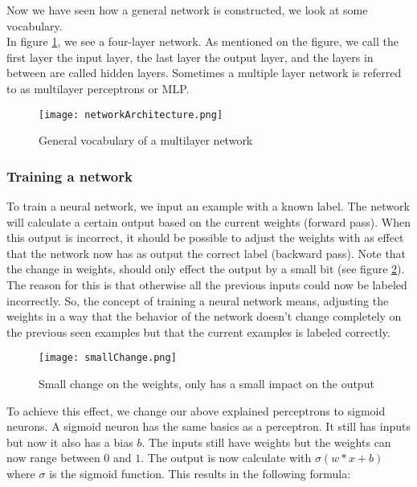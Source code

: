 Now we have seen how a general network is constructed, we look at some vocabulary. \\
In figure \ref{fig:networkArch}, we see a four-layer network. As mentioned on the figure, we call the first layer the input layer, the last layer the output layer, and the layers in between are called hidden layers. Sometimes a multiple layer network is referred to as multilayer perceptrons or MLP. 

\begin{figure}[!htb]
	\centering
	\texttt{[image: networkArchitecture.png]}
	\caption{General vocabulary of a multilayer network \cite{NNintro:online}}
	\label{fig:networkArch}
\end{figure} 		


		\subsubsection{Training a network}
		
To train a neural network, we input an example with a known label. The network will calculate a certain output based on the current weights (forward pass). When this output is incorrect, it should be possible to adjust the weights with as effect that the network now has as output the correct label (backward pass). Note that the change in weights, should only effect the output by a small bit (see figure \ref{fig:smallChange}). The reason for this is that otherwise all the previous inputs could now be labeled incorrectly. So, the concept of training a neural network means, adjusting the weights in a way that the behavior of the network doesn't change completely on the previous seen examples but that the current examples is labeled correctly. \\

\begin{figure}[!htb]
	\centering
	\texttt{[image: smallChange.png]}
	\caption{Small change on the weights, only has a small impact on the output \cite{NNintro:online}}
	\label{fig:smallChange}
\end{figure} 

To achieve this effect, we change our above explained perceptrons to sigmoid neurons. A sigmoid neuron has the same basics as a perceptron. It still has inputs but now it also has a bias $b$. The inputs still have weights but the weights can now range between $0$ and $1$. The output is now calculate with $\sigma(w*x+b)$ where $\sigma$ is the sigmoid function. This results in the following formula: 

